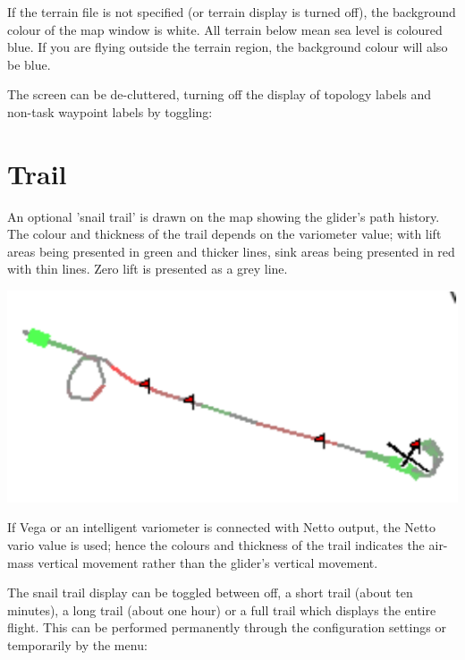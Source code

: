 \documentclass[a4paper,12pt]{refrep}
\begin{document}
If the terrain file is not specified (or terrain display is turned
off), the background colour of the map window is white.  All terrain
below mean sea level is coloured blue.  If you are flying outside the
terrain region, the background colour will also be blue.

The screen can be de-cluttered, turning off the display of topology
labels and non-task waypoint labels by toggling:
\begin{quote}
\blink{}
\end{quote}


\section{Trail}\label{sec:trail}

An optional 'snail trail' is drawn on the map showing the glider's
path history.  The colour and thickness of the trail depends on the
variometer value; with lift areas being presented in green and thicker
lines, sink areas being presented in red with thin lines.  Zero lift
is presented as a grey line.

\begin{center}
\includegraphics[angle=0,width=0.8\linewidth,keepaspectratio='true']{figures/snail.pdf}
\end{center}

If Vega or an intelligent variometer is connected with Netto output,
the Netto vario value is used; hence the colours and thickness of the
trail indicates the air-mass vertical movement rather than the glider's
vertical movement.

The snail trail display can be toggled between off, a short trail
(about ten minutes), a long trail (about one hour) or a full trail
which displays the entire flight.  This can be performed permanently
through the configuration settings or temporarily by the menu:
\begin{quote}
\blink{}
\end{quote}
\end{document}
